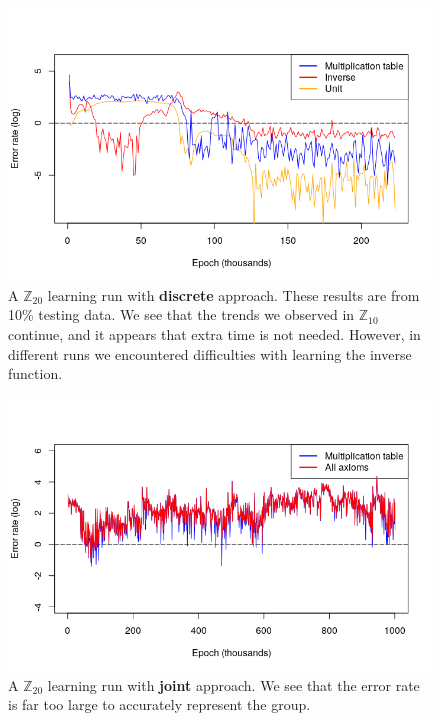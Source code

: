 \begin{figure}[h]
\centering
\caption{A $\mathbb{Z}_{20}$ learning run with \textbf{discrete} approach. These results are from 10\% testing data. We see that the trends we observed in $\mathbb{Z}_{10}$ continue, and it appears that extra time is not needed. However, in different runs we encountered difficulties with learning the inverse function.}
\label{graph:z20_90percent}
\includegraphics[width=\linewidth]{../img/z20_90percent.png}
\end{figure}

\begin{figure}
\caption{A $\mathbb{Z}_{20}$ learning run with \textbf{joint} approach. We see that the error rate is far too large to accurately represent the group.}
\label{grah:z20_joint}
\includegraphics[width=\linewidth]{../img/z20_joint.png}

\end{figure}

